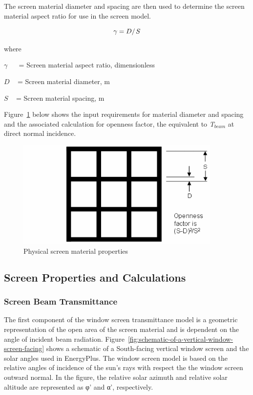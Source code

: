 The screen material diameter and spacing are then used to determine the screen material aspect ratio for use in the screen model.

\begin{equation}
\gamma  = {D \mathord{\left/ {\vphantom {D S}} \right. } S}
\end{equation}

where

\(\gamma\) ~~ = Screen material aspect ratio, dimensionless

\(D\) ~ = Screen material diameter, m

\(S\) ~ = Screen material spacing, m

Figure~\ref{fig:physical-screen-material-properties} below shows the input requirements for material diameter and spacing and the associated calculation for openness factor, the equivalent to \emph{T\(_{beam}\)} at direct normal incidence.

\begin{figure}[hbtp] %
\centering
\includegraphics[width=0.9\textwidth, height=0.9\textheight, keepaspectratio=true]{media/image1153.png}
\caption{Physical screen material properties \protect \label{fig:physical-screen-material-properties}}
\end{figure}

\subsection{Screen Properties and Calculations}\label{screen-properties-and-calculations}

\subsubsection{Screen Beam Transmittance}\label{screen-beam-transmittance}

The first component of the window screen transmittance model is a geometric representation of the open area of the screen material and is dependent on the angle of incident beam radiation. Figure~\ref{fig:schematic-of-a-vertical-window-screen-facing} shows a schematic of a South-facing vertical window screen and the solar angles used in EnergyPlus. The window screen model is based on the relative angles of incidence of the sun's rays with respect the the window screen outward normal. In the figure, the relative solar azimuth and relative solar altitude are represented as φ' and α', respectively.


